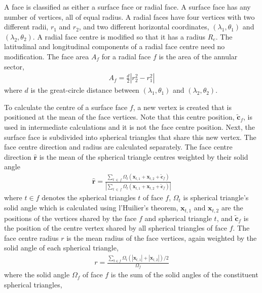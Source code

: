 A face is classified as either a surface face or radial face.
A surface face has any number of vertices, all of equal radius.
A radial faces have four vertices with two different radii, $r_1$ and $r_2$, and two different horizontal coordinates, $(\lambda_1, \theta_1)$ and $(\lambda_2, \theta_2)$.
A radial face centre is modified so that it has a radius $R_e$.  The latitudinal and longitudinal components of a radial face centre need no modification.
The face area $A_f$ for a radial face $f$ is the area of the annular sector,
\begin{align}
	A_f = \frac{d}{2} \left\lvert r_2^2 - r_1^2 \right\rvert
\end{align}
where $d$ is the great-circle distance between $(\lambda_1, \theta_1)$ and $(\lambda_2, \theta_2)$.

To calculate the centre of a surface face $f$, a new vertex is created that is positioned at the mean of the face vertices.  Note that this centre position, $\mathbf{\tilde{c}}_f$, is used in intermediate calculations and it is not the face centre position.
Next, the surface face is subdivided into spherical triangles that share this new vertex.
The face centre direction and radius are calculated separately.  The face centre direction $\mathbf{\hat{r}}$ is the mean of the spherical triangle centres weighted by their solid angle
\begin{align}
	\mathbf{\hat{r}} = \frac
	{\sum_{t\:\in\:f}{\Omega_t \left(\mathbf{x}_{t,1} + \mathbf{x}_{t,2} + \mathbf{\tilde{c}}_f \right)}}
	{\left\lvert \sum_{t\:\in\:f}{\Omega_t \left(\mathbf{x}_{t,1} + \mathbf{x}_{t,2} + \mathbf{\tilde{c}}_f \right)} \right\rvert} \label{eqn:face-centre-dir}
\end{align}
where $t\in f$ denotes the spherical triangles $t$ of face $f$, $\Omega_t$ is spherical triangle's solid angle which is calculated using l'Huilier's theorem, $\mathbf{x}_{t,1}$ and $\mathbf{x}_{t,2}$ are the positions of the vertices shared by the face $f$ and spherical triangle $t$, and $\mathbf{\tilde{c}}_f$ is the position of the centre vertex shared by all spherical triangles of face $f$.
The face centre radius $r$ is the mean radius of the face vertices, again weighted by the solid angle of each spherical triangle,
\begin{align}
	r = \frac
	{\sum_{t\in f}{\Omega_t \left(\left\lvert \mathbf{x}_{t,1} \right\rvert + \left\lvert \mathbf{x}_{t,2} \right\rvert \right)/2}}
	{\Omega_f} \label{eqn:face-centre-mag}
\end{align}
where the solid angle $\Omega_f$ of face $f$ is the sum of the solid angles of the constituent spherical triangles,
